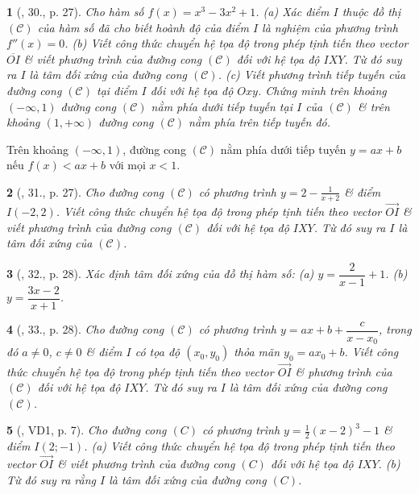 \documentclass{article}
\newtheorem{baitoan}{}
\begin{document}
\begin{baitoan}[\cite{SGK_Toan_12_giai_tich_nang_cao}, 30., p. 27]
	Cho hàm số $f(x) = x^3 - 3x^2 + 1$. (a) Xác điểm $I$ thuộc đồ thị $(\mathcal{C})$ của hàm số đã cho biết hoành độ của điểm $I$ là nghiệm của phương trình $f''(x) = 0$. (b) Viết công thức chuyển hệ tọa độ trong phép tịnh tiến theo vector $\overline{OI}$ \& viết phương trình của đường cong $(\mathcal{C})$ đối với hệ tọa độ $IXY$. Từ đó suy ra $I$ là tâm đối xứng của đường cong $(\mathcal{C})$. (c) Viết phương trình tiếp tuyến của đường cong $(\mathcal{C})$ tại điểm $I$ đối với hệ tọa độ $Oxy$. Chứng minh trên khoảng $(-\infty,1)$ đường cong $(\mathcal{C})$ nằm phía dưới tiếp tuyến tại $I$ của $(\mathcal{C})$ \& trên khoảng $(1,+\infty)$ đường cong $(\mathcal{C})$ nằm phía trên tiếp tuyến đó.
\end{baitoan}
 Trên khoảng $(-\infty,1)$, đường cong $(\mathcal{C})$ nằm phía dưới tiếp tuyến $y = ax + b$ nếu $f(x) < ax + b$ với mọi $x < 1$.

\begin{baitoan}[\cite{SGK_Toan_12_giai_tich_nang_cao}, 31., p. 27]
	Cho đường cong $(\mathcal{C})$ có phương trình $y = 2 - \frac{1}{x + 2}$ \& điểm $I(-2,2)$. Viết công thức chuyển hệ tọa độ trong phép tịnh tiến theo vector $\overrightarrow{OI}$ \& viết phương trình của đường cong $(\mathcal{C})$ đối với hệ tọa độ $IXY$. Từ đó suy ra $I$ là tâm đối xứng của $(\mathcal{C})$.
\end{baitoan}

\begin{baitoan}[\cite{SGK_Toan_12_giai_tich_nang_cao}, 32., p. 28]
	Xác định tâm đối xứng của đồ thị hàm số: (a) $y = \dfrac{2}{x - 1} + 1$. (b) $y = \dfrac{3x - 2}{x + 1}$.
\end{baitoan}

\begin{baitoan}[\cite{SGK_Toan_12_giai_tich_nang_cao}, 33., p. 28]
	Cho đường cong $(\mathcal{C})$ có phương trình $y = ax + b + \dfrac{c}{x - x_0}$, trong đó $a\ne0$, $c\ne0$ \& điểm $I$ có tọa độ $(x_0,y_0)$ thỏa mãn $y_0 = ax_0 + b$. Viết công thức chuyển hệ tọa độ trong phép tịnh tiến theo vector $\overrightarrow{OI}$ \& phương trình của $(\mathcal{C})$ đối với hệ tọa độ $IXY$. Từ đó suy ra $I$ là tâm đối xứng của đường cong $(\mathcal{C})$.
\end{baitoan}

\begin{baitoan}[\cite{TLCT_giai_tich_12}, VD1, p. 7]
	Cho đường cong $(C)$ có phương trình $y = \frac{1}{2}(x - 2)^3 - 1$ \& điểm $I(2;-1)$. (a) Viết công thức chuyển hệ tọa độ trong phép tịnh tiến theo vector $\overrightarrow{OI}$ \& viết phương trình của đường cong $(C)$ đối với hệ tọa độ $IXY$. (b) Từ đó suy ra rằng $I$ là tâm đối xứng của đường cong $(C)$.
\end{baitoan}
\end{document}
